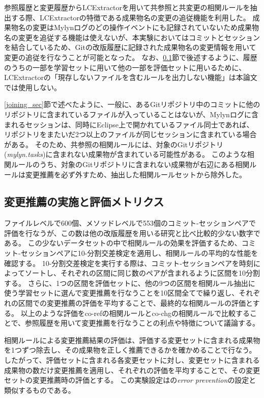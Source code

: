 \documentclass[a4paper]{jsbook}
\begin{document}
参照履歴と変更履歴からLCExtractorを用いて共参照と共変更の相関ルールを抽出する際、LCExtractorの特徴である成果物名の変更の追従機能を利用した。
成果物名の変更はMylynログのどの操作イベントにも記録されていないため成果物名の変更を追従する機能は使えないが、本実験においてはコミットとセッションを結合しているため、Gitの改版履歴に記録された成果物名の変更情報を用いて変更の追従を行なうことが可能となった。
なお、\ref{metrics_sec}節で後述するように、履歴のうちの一部を学習セットに用いて他の一部を評価セットに用いるために、LCExtractorの「現存しないファイルを含むルールを出力しない機能」は本論文では使用しない。

\ref{joining_sec}節で述べたように、一般に、あるGitリポジトリ中のコミットに他のリポジトリに含まれているファイルが入っていることはないが、Mylynログに含まれるセッションは、同時にEclipse上で開かれているファイル同士であれば、リポジトリをまたいだ2つ以上のファイルが同じセッションに含まれている場合がある。
そのため、共参照の相関ルールには、対象のGitリポジトリ({\it mylyn.tasks})に含まれない成果物が含まれている可能性がある。
このような相関ルールのうち、対象のGitリポジトリに含まれない成果物が右辺にある相関ルールは変更推薦を必ず外すため、抽出した相関ルールセットから除外した。

\subsection{変更推薦の実施と評価メトリクス}\label{metrics_sec}

ファイルレベルで600個、メソッドレベルで553個のコミット-セッションペアで評価を行なうが、この数は他の改版履歴を用いる研究と比べ比較的少ない数字である。
この少ないデータセットの中で相関ルールの効果を評価するため、コミット-セッションペアに10-分割交差検定を適用し、相関ルールの平均的な性能を確認する。
10-分割交差検定を実行する際は、コミット-セッションペアを時刻によってソートし、それぞれの区間に同じ数のペアが含まれるように区間を10分割する。
さらに、1つの区間を評価セットに、他の9つの区間を相関ルール抽出に使う学習セットに選んで変更推薦を行なうことを10区間全てで繰り返し、それぞれの区間での変更推薦の評価を平均することで、最終的な相関ルールの評価とする。
以上のような評価をco-refの相関ルールとco-chgの相関ルールで比較することで、参照履歴を用いて変更推薦を行なうことの利点や特徴について議論する。

相関ルールによる変更推薦結果の評価は、評価する変更セットに含まれる成果物を1つずつ除去し、その成果物を正しく推薦できるかを確かめることで行なう。
したがって、評価セットに含まれる各変更セットに対し、変更セットに含まれる成果物の数だけ変更推薦を適用し、それぞれの評価を平均することで、その変更セットの変更推薦時の評価とする。
この実験設定は\cite{Zimmermann:2005}の{\it error prevention}の設定と類似するものである。
\end{document}
